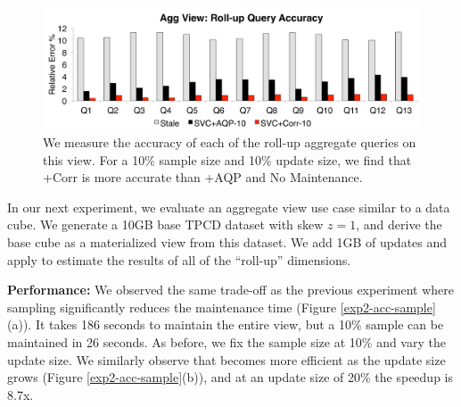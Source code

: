 \begin{figure}[t]\vspace{-.5em}
\centering
 \includegraphics[scale=0.13]{exp/msdc_3.pdf}\vspace{-.5em}
   \caption{We measure the accuracy of each of the roll-up aggregate queries on this view. For a 10\% sample size and 10\% update size, we find that \svcnospace+Corr is more accurate than \svcnospace+AQP and No Maintenance.\vspace{-.5em}\label{exp2-acc-sample2}}
\end{figure}





In our next experiment, we evaluate an aggregate view use case similar to a data cube.
We generate a 10GB base TPCD dataset with skew $z=1$, and derive the base cube as a materialized view from this dataset.
We add 1GB of updates and apply \svc to estimate the results of all of the ``roll-up'' dimensions.

\textbf{Performance: }
We observed the same trade-off as the previous experiment where sampling significantly reduces the maintenance time (Figure \ref{exp2-acc-sample}(a)).
It takes 186 seconds to maintain the entire view, but a 10\% sample can be maintained in 26 seconds.
As before, we fix the sample size at 10\% and vary the update size.
We similarly observe that \svc becomes more efficient as the update size grows (Figure \ref{exp2-acc-sample}(b)), and at an update size of 20\%  the speedup is 8.7x.

